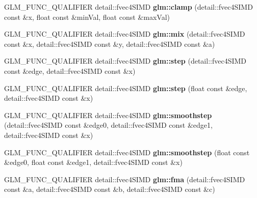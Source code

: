 \begin{DoxyCompactItemize}
\item 
\mbox{\label{simd__vec4_8inl_ae7db62bebbc1cdea7444d6f89313af2f}} 
G\+L\+M\+\_\+\+F\+U\+N\+C\+\_\+\+Q\+U\+A\+L\+I\+F\+I\+ER detail\+::fvec4\+S\+I\+MD {\bfseries glm\+::clamp} (detail\+::fvec4\+S\+I\+MD const \&x, float const \&min\+Val, float const \&max\+Val)
\item 
\mbox{\label{simd__vec4_8inl_a4b388e53d27196411517929d6ee91867}} 
G\+L\+M\+\_\+\+F\+U\+N\+C\+\_\+\+Q\+U\+A\+L\+I\+F\+I\+ER detail\+::fvec4\+S\+I\+MD {\bfseries glm\+::mix} (detail\+::fvec4\+S\+I\+MD const \&x, detail\+::fvec4\+S\+I\+MD const \&y, detail\+::fvec4\+S\+I\+MD const \&a)
\item 
\mbox{\label{simd__vec4_8inl_a0af681288eaacb38ded2a597bc7fd214}} 
G\+L\+M\+\_\+\+F\+U\+N\+C\+\_\+\+Q\+U\+A\+L\+I\+F\+I\+ER detail\+::fvec4\+S\+I\+MD {\bfseries glm\+::step} (detail\+::fvec4\+S\+I\+MD const \&edge, detail\+::fvec4\+S\+I\+MD const \&x)
\item 
\mbox{\label{simd__vec4_8inl_ac7e3b091e30c01352c8349c656d52a9f}} 
G\+L\+M\+\_\+\+F\+U\+N\+C\+\_\+\+Q\+U\+A\+L\+I\+F\+I\+ER detail\+::fvec4\+S\+I\+MD {\bfseries glm\+::step} (float const \&edge, detail\+::fvec4\+S\+I\+MD const \&x)
\item 
\mbox{\label{simd__vec4_8inl_acaa3fe01372937d4ee7739ad87db0f15}} 
G\+L\+M\+\_\+\+F\+U\+N\+C\+\_\+\+Q\+U\+A\+L\+I\+F\+I\+ER detail\+::fvec4\+S\+I\+MD {\bfseries glm\+::smoothstep} (detail\+::fvec4\+S\+I\+MD const \&edge0, detail\+::fvec4\+S\+I\+MD const \&edge1, detail\+::fvec4\+S\+I\+MD const \&x)
\item 
\mbox{\label{simd__vec4_8inl_a38415c03c75a84267151b370d866e42e}} 
G\+L\+M\+\_\+\+F\+U\+N\+C\+\_\+\+Q\+U\+A\+L\+I\+F\+I\+ER detail\+::fvec4\+S\+I\+MD {\bfseries glm\+::smoothstep} (float const \&edge0, float const \&edge1, detail\+::fvec4\+S\+I\+MD const \&x)
\item 
\mbox{\label{simd__vec4_8inl_a3dd47df42a32adc14c604bed47633830}} 
G\+L\+M\+\_\+\+F\+U\+N\+C\+\_\+\+Q\+U\+A\+L\+I\+F\+I\+ER detail\+::fvec4\+S\+I\+MD {\bfseries glm\+::fma} (detail\+::fvec4\+S\+I\+MD const \&a, detail\+::fvec4\+S\+I\+MD const \&b, detail\+::fvec4\+S\+I\+MD const \&c)

\end{DoxyCompactItemize}
